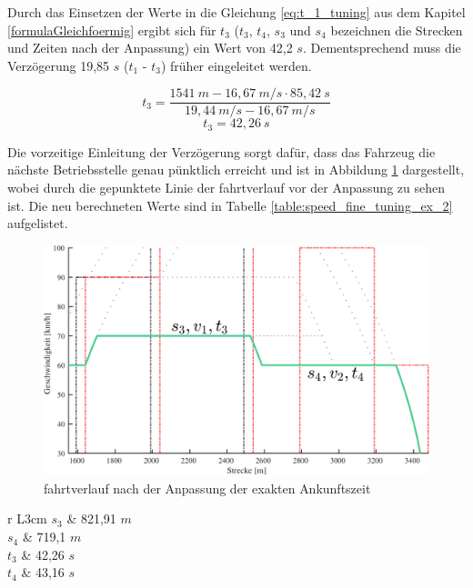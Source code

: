 Durch das Einsetzen der Werte in die Gleichung \ref{eq:t_1_tuning} aus dem Kapitel \ref{formulaGleichfoermig} ergibt sich für $t_3$ ($t_3$, $t_4$, $s_3$ und $s_4$ bezeichnen die Strecken und Zeiten nach der Anpassung) ein Wert von 42,2 $s$. Dementsprechend muss die Verzögerung 19,85 $s$ ($t_1$ - $t_3$) früher eingeleitet werden.
\begin{figure}[H]
\[t_{3} = \frac{1541\:m - 16,67\:m/s \cdot 85,42\:s}{19,44\:m/s - 16,67\:m/s}\]
\[t_{3} = 42,26\:s\]
\end{figure}
Die vorzeitige Einleitung der Verzögerung sorgt dafür, dass das Fahrzeug die nächste Betriebsstelle genau pünktlich erreicht und ist in Abbildung \ref{fig:it12} dargestellt, wobei durch die gepunktete Linie der \Gls{fahrtverlauf} vor der Anpassung zu sehen ist. Die neu berechneten Werte sind in Tabelle \ref{table:speed_fine_tuning_ex_2} aufgelistet.
\begin{figure}
  \includegraphics[width=\linewidth]{../images/matlab/it12.pdf}
  \caption{\Gls{fahrtverlauf} nach der Anpassung der exakten Ankunftszeit}
  \label{fig:it12}
\end{figure}
\begin{table}
\begin{center}
\renewcommand{\arraystretch}{1.2}
\begin{tabular}{r L{3cm}}
$s_3$                   	&   821,91 $m$                      	\\ 
$s_4$                   	&   719,1 $m$                         	\\ 
$t_3$                   	&   42,26 $s$                         	\\ 
$t_4$                   	&   43,16 $s$                         	\\ 
\end{tabular}
\renewcommand{\arraystretch}{1}
\caption{Geschwindigkeiten, Strecken und Zeiten vor und nach der Verzögerung nach der Anpassung}
\label{table:speed_fine_tuning_ex_2}
\end{center}
\end{table}
